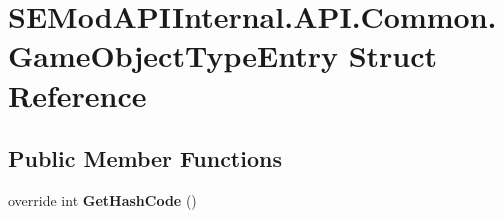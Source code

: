 \hypertarget{struct_s_e_mod_a_p_i_internal_1_1_a_p_i_1_1_common_1_1_game_object_type_entry}{}\section{S\+E\+Mod\+A\+P\+I\+Internal.\+A\+P\+I.\+Common.\+Game\+Object\+Type\+Entry Struct Reference}
\label{struct_s_e_mod_a_p_i_internal_1_1_a_p_i_1_1_common_1_1_game_object_type_entry}
\subsection*{Public Member Functions}
\begin{DoxyCompactItemize}
\item 
\hypertarget{struct_s_e_mod_a_p_i_internal_1_1_a_p_i_1_1_common_1_1_game_object_type_entry_a02f15bf35e8e8f1b5609dc12fda7a2d1}{}override int {\bfseries Get\+Hash\+Code} ()\label{struct_s_e_mod_a_p_i_internal_1_1_a_p_i_1_1_common_1_1_game_object_type_entry_a02f15bf35e8e8f1b5609dc12fda7a2d1}

\end{DoxyCompactItemize}

